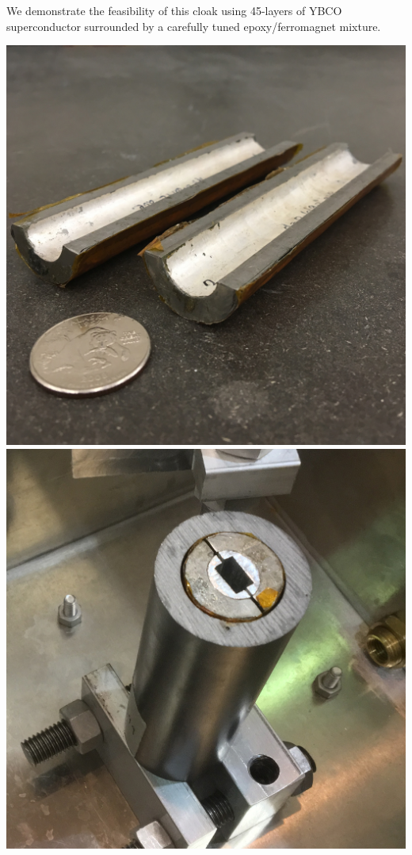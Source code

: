 \documentclass[landscape,a0paper,fontscale=0.290]{baposter} %
\begin{document}
\begin{poster}
{We demonstrate the feasibility of this cloak using 45-layers of YBCO superconductor surrounded by a carefully tuned epoxy/ferromagnet mixture.

\begin{center}
\includegraphics[width=0.46\linewidth]{pic_sc45layer.jpg}
\includegraphics[width=0.46\linewidth]{pic_cloak.jpg}
\end{center}

}



\end{poster}
\end{document}

